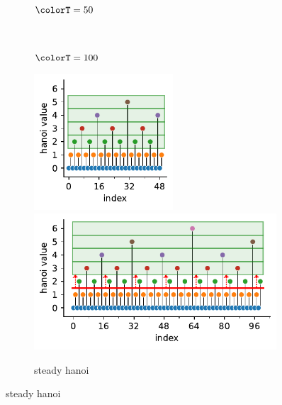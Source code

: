 \begin{figure}[h!]
  \centering

\begin{subfigure}[b]{\linewidth}
\begin{minipage}[]{0.08\textwidth}
~
\end{minipage}%
\begin{minipage}[]{0.25\textwidth}
\centering
$\colorT = 50$
\end{minipage}%
\begin{minipage}[]{0.05\textwidth}
~
\end{minipage}%
\begin{minipage}[]{0.61\textwidth}
\centering
$\colorT = 100$
\end{minipage}
\includegraphics[height=2in]{binder/teeplots/hanoi-strategy/hue=hanoi-value+viz=lolliplot+what=top-n-before+x=index+y=hanoi-value+ext=}%
\includegraphics[height=2in]{binder/teeplots/hanoi-strategy/hue=hanoi-value+viz=lolliplot+what=top-n-after+x=index+y=hanoi-value+ext=}
\caption{
  steady hanoi
}
\end{subfigure}


\end{figure}
